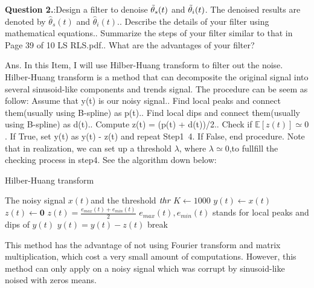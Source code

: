 \documentclass[11pt]{article}
\begin{document}
\begin{mdframed}[backgroundcolor=lightshadecolor, linewidth=0pt, innertopmargin=12pt, innerbottommargin=12pt]
{\bf Question 2.}:Design a filter to denoise $\Tilde{\theta}_s(t)$ and $\Tilde{\theta}_i(t)$. The denoised results are denoted by $\hat{\theta}_s(t)$ and $\hat{\theta}_i(t)$.. Describe the details of your filter using mathematical equations.. Summarize the steps of your filter similar to that in Page 39 of 10 LS RLS.pdf.. What are the advantages of your filter?
\end{mdframed}
Ans.\newline
In this Item, I will use Hilber-Huang transform to filter out the noise.\newline
Hilber-Huang transform is a method that can decomposite the original signal into several sinusoid-like components and trends signal.\newline
The procedure can be seem as follow:\newline
Assume that y(t) is our noisy signal.. Find local peaks and connect them(usually using B-spline) as p(t).. Find local dips and connect them(usually using B-spline) as d(t).. Compute z(t) = (p(t) + d(t))/2.. Check if $\mathbb{E}[z(t)] \simeq 0$. If True, set y(t) as y(t) - z(t) and repeat Step1~4. If False, end procedure.\newline
Note that in realization, we can set up a threshold $\lambda$, where $\lambda \simeq 0$,to fullfill the checking process in step4.\newline
See the algorithm down below:

\begin{algorithm}
    \caption{Hilber-Huang transform}\label{alg:cap}
    \begin{algorithmic}
    \Require The noisy signal $x(t)$and the threshold $\emph{thr}$
    \State $K \gets 1000$
    \State $y(t) \gets x(t)$
    \State $z(t) \gets \textbf{0}$
        \State $z(t) = \frac{e_{max}(t) + e_{min}(t)}{2}$ \Comment $e_{max}(t),e_{min}(t)$ stands for local peaks and dips of $y(t)$
            \State $y(t) = y(t) - z(t)$
        \Else
            \State break
        \EndIf
    \EndFor
    \end{algorithmic}
\end{algorithm}
\noindent This method has the advantage of not using Fourier transform and matrix multiplication, which cost a very small amount of computations.\newline
However, this method can only apply on a noisy signal which was corrupt by sinusoid-like noised with zeros means.
\end{document}
